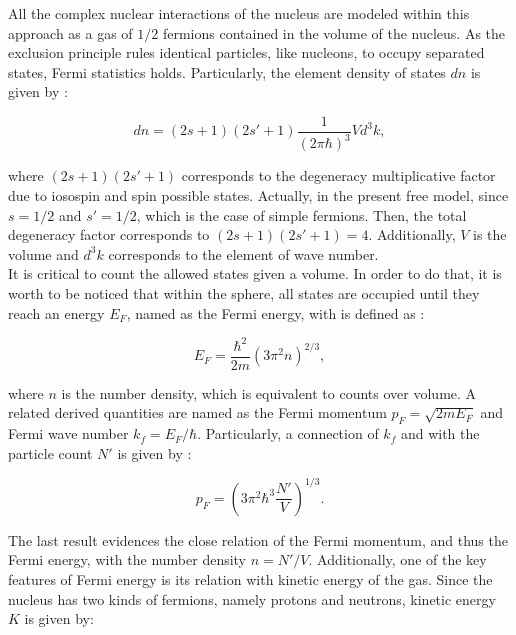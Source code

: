 \documentclass[openany]{book}
\begin{document}
All the complex nuclear interactions of the nucleus are modeled within this approach as a gas of $1/2$ fermions contained in the volume of the nucleus. As the exclusion principle rules identical particles, like nucleons, to occupy separated states, Fermi statistics holds. Particularly, the element density of states $dn$  is given by \cite{bohr_mottelson_1998}: 


\begin{equation}\label{eq:liquidDrop_FermiGas_density}
	dn = (2s + 1)(2s' + 1) \frac{1}{(2\pi \hbar)^3} V d^3k,
\end{equation}

where $(2s + 1)(2s' +1)$ corresponds to the degeneracy multiplicative factor due to iosospin and spin possible states. Actually, in the present free model, since $s = 1/2$ and $s' = 1/2$, which is the case of simple fermions. Then, the total degeneracy factor corresponds to $(2s + 1)(2s' + 1) = 4$. Additionally, $V$ is the volume and  $ d^3k$ corresponds to the element of wave number. \\
 
It is critical to count the allowed states given a volume. In order to do that, it is worth to be noticed that within the sphere, all states are occupied until they reach an energy $E_F$, named as the Fermi energy, with is defined as \cite{basdevant_rich_spiro_2004}:

\begin{equation}\label{eq:liquidDrop_FermiGas_FermiEnergy}
	E_F = \frac{\hbar^2}{2m}(3\pi^2 n)^{2/3},
\end{equation}

where $n$ is the number density, which is equivalent to counts over volume. A related derived quantities are named as the Fermi momentum $p_F = \sqrt{2mE_F}$ and Fermi wave number $k_f = E_F/\hbar$.  Particularly, a connection of $k_f$ and with the particle count $N'$ is given by \cite{bohr_mottelson_1998}: 

\begin{equation}\label{eq:liquidDrop_FermiGas_momentum}
	p_F =  \left( 3 \pi^2 \hbar^3 \frac{N' }{V}\right)^{1/3}.
\end{equation}

The last result evidences the close relation of the Fermi momentum, and thus the Fermi energy, with the number density $n = N'/V$. Additionally, one of the key features of Fermi energy is its relation with kinetic energy of the gas. Since the nucleus has two kinds of fermions, namely protons and neutrons,  kinetic energy $K$ is given by:
\end{document}
